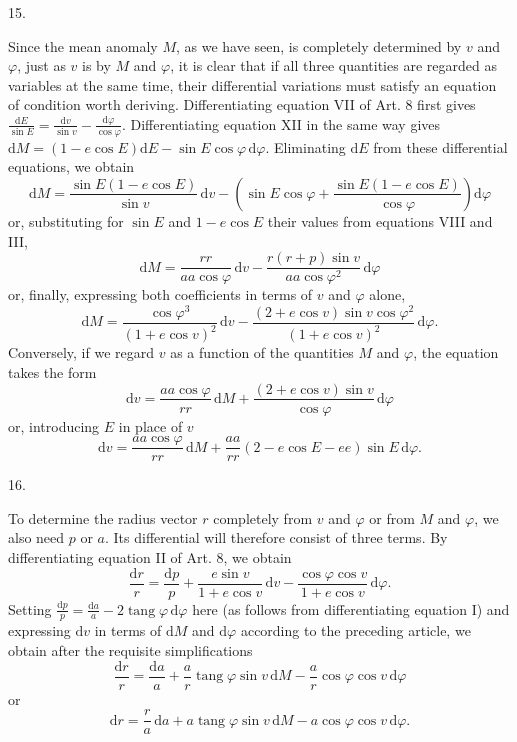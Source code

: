 \par{}
\begin{center}
\hypertarget{native-033-article015}{}15.
\end{center}
Since the mean anomaly $M$, as we have seen, is completely determined by $v$ and $\varphi$, just as $v$ is by $M$ and $\varphi$, it is clear that if all three quantities are regarded as variables at the same time, their differential variations must satisfy an equation of condition worth deriving. Differentiating equation VII of Art. 8 first gives $\frac{\mathrm{d}E}{\sin E}=\frac{\mathrm{d}v}{\sin v}-\frac{\mathrm{d}\varphi}{\cos\varphi}$. Differentiating equation XII in the same way gives $\mathrm{d}M=(1-e\cos E)\mathrm{d}E-\sin E\cos\varphi\,\mathrm{d}\varphi$. Eliminating $\mathrm{d}E$ from these differential equations, we obtain
\[
\mathrm{d}M=\frac{\sin E(1-e\cos E)}{\sin v}\,\mathrm{d}v-\left(\sin E\cos\varphi+\frac{\sin E(1-e\cos E)}{\cos\varphi}\right)\mathrm{d}\varphi
\]
or, substituting for $\sin E$ and $1-e\cos E$ their values from equations VIII and III,
\[
\mathrm{d}M=\frac{r r}{a a\cos\varphi}\,\mathrm{d}v-\frac{r(r+p)\sin v}{a a\cos\varphi^2}\,\mathrm{d}\varphi
\]
or, finally, expressing both coefficients in terms of $v$ and $\varphi$ alone,
\[
\mathrm{d}M=\frac{\cos\varphi^3}{(1+e\cos v)^2}\,\mathrm{d}v-\frac{(2+e\cos v)\sin v\cos\varphi^2}{(1+e\cos v)^2}\,\mathrm{d}\varphi.
\]
Conversely, if we regard $v$ as a function of the quantities $M$ and $\varphi$, the equation takes the form
\[
\mathrm{d}v=\frac{a a\cos\varphi}{r r}\,\mathrm{d}M+\frac{(2+e\cos v)\sin v}{\cos\varphi}\,\mathrm{d}\varphi
\]
or, introducing $E$ in place of $v$\,
\[
\mathrm{d}v=\frac{a a\cos\varphi}{r r}\,\mathrm{d}M+\frac{a a}{r r}(2-e\cos E-e e)\sin E\,\mathrm{d}\varphi.
\]

\par{}
\begin{center}
\hypertarget{native-034-article016}{}16.
\end{center}
To determine the radius vector $r$ completely from $v$ and $\varphi$ or from $M$ and $\varphi$, we also need $p$ or $a$. Its differential will therefore consist of three terms. By differentiating equation II of Art. 8, we obtain
\[
\frac{\mathrm{d}r}{r}=\frac{\mathrm{d}p}{p}+\frac{e\sin v}{1+e\cos v}\,\mathrm{d}v-\frac{\cos\varphi\cos v}{1+e\cos v}\,\mathrm{d}\varphi.
\]
Setting $\frac{\mathrm{d}p}{p}=\frac{\mathrm{d}a}{a}-2\operatorname{tang}\varphi\,\mathrm{d}\varphi$ here (as follows from differentiating equation I) and expressing $\mathrm{d}v$ in terms of $\mathrm{d}M$ and $\mathrm{d}\varphi$ according to the preceding article, we obtain after the requisite simplifications
\[
\frac{\mathrm{d}r}{r}=\frac{\mathrm{d}a}{a}+\frac{a}{r}\operatorname{tang}\varphi\sin v\,\mathrm{d}M-\frac{a}{r}\cos\varphi\cos v\,\mathrm{d}\varphi
\]
or
\[
\mathrm{d}r=\frac{r}{a}\,\mathrm{d}a+a\operatorname{tang}\varphi\sin v\,\mathrm{d}M-a\cos\varphi\cos v\,\mathrm{d}\varphi.
\]

